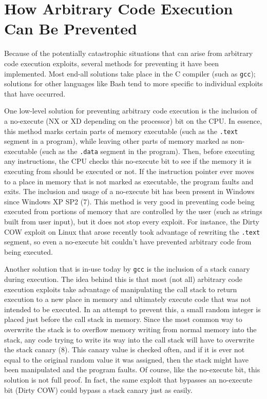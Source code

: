 \section{How Arbitrary Code Execution Can Be Prevented}

Because of the potentially catastrophic situations that can arise from arbitrary code execution exploits, several methods for preventing it have been implemented. Most end-all solutions take place in the C compiler (such as \texttt{gcc}); solutions for other languages like Bash tend to more specific to individual exploits that have occurred.

One low-level solution for preventing arbitrary code execution is the inclusion of a no-execute (NX or XD depending on the processor) bit on the CPU. In essence, this method marks certain parts of memory executable (such as the \texttt{.text} segment in a program), while leaving other parts of memory marked as non-executable (such as the \texttt{.data} segment in the program). Then, before executing any instructions, the CPU checks this no-execute bit to see if the memory it is executing from should be executed or not. If the instruction pointer ever moves to a place in memory that is not marked as executable, the program faults and exits. The inclusion and usage of a no-execute bit has been present in Windows since Windows XP SP2 (7). This method is very good in preventing code being executed from portions of memory that are controlled by the user (such as strings built from user input), but it does not stop every exploit. For instance, the Dirty COW exploit on Linux that arose recently took advantage of rewriting the \texttt{.text} segment, so even a no-execute bit couldn’t have prevented arbitrary code from being executed.

Another solution that is in-use today by \texttt{gcc} is the inclusion of a stack canary during execution. The idea behind this is that most (not all) arbitrary code execution exploits take advantage of manipulating the call stack to return execution to a new place in memory and ultimately execute code that was not intended to be executed. In an attempt to prevent this, a small random integer is placed just before the call stack in memory. Since the most common way to overwrite the stack is to overflow memory writing from normal memory into the stack, any code trying to write its way into the call stack will have to overwrite the stack canary (8). This canary value is checked often, and if it is ever not equal to the original random value it was assigned, then the stack might have been manipulated and the program faults. Of course, like the no-execute bit, this solution is not full proof. In fact, the same exploit that bypasses an no-execute bit (Dirty COW) could bypass a stack canary just as easily.

